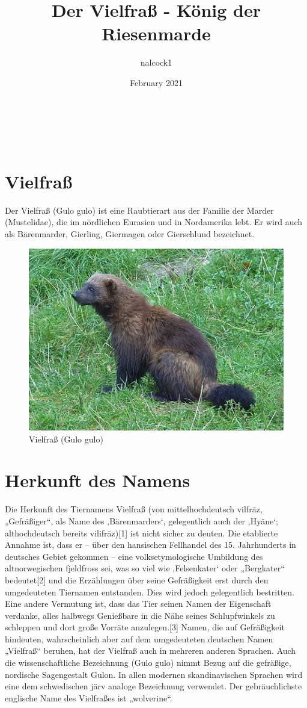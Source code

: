 \documentclass{scrartcl}
\title{Der Vielfraß - König der Riesenmarde}
\author{nalcock1 }
\date{February 2021}
\begin{document}
\maketitle
\tableofcontents
\newpage

\\
\\
\section{Vielfraß}
Der Vielfraß (Gulo gulo) ist eine Raubtierart aus der Familie der Marder (Mustelidae), die im nördlichen Eurasien und in Nordamerika lebt. Er wird auch als Bärenmarder, Gierling, Giermagen oder Gierschlund bezeichnet. 



\begin{figure}[h!]
\centering
\includegraphics[scale=0.7]{Vielfraß}
\caption{Vielfraß (Gulo gulo)}
\label{Vielfraß (Gulo gulo)}
\end{figure}

\section{Herkunft des Namens}
Die Herkunft des Tiernamens Vielfraß (von mittelhochdeutsch vilfrāz, „Gefräßiger“, als Name des ‚Bärenmarders‘, gelegentlich auch der ‚Hyäne‘; althochdeutsch bereits vilifrāz)[1] ist nicht sicher zu deuten. Die etablierte Annahme ist, dass er – über den hansischen Fellhandel des 15. Jahrhunderts in deutsches Gebiet gekommen – eine volksetymologische Umbildung des altnorwegischen fjeldfross sei, was so viel wie ‚Felsenkater‘ oder „Bergkater“ bedeutet[2] und die Erzählungen über seine Gefräßigkeit erst durch den umgedeuteten Tiernamen entstanden. Dies wird jedoch gelegentlich bestritten.
\\
Eine andere Vermutung ist, dass das Tier seinen Namen der Eigenschaft verdanke, alles halbwegs Genießbare in die Nähe seines Schlupfwinkels zu schleppen und dort große Vorräte anzulegen.[3] Namen, die auf Gefräßigkeit hindeuten, wahrscheinlich aber auf dem umgedeuteten deutschen Namen „Vielfraß“ beruhen, hat der Vielfraß auch in mehreren anderen Sprachen. Auch die wissenschaftliche Bezeichnung (Gulo gulo) nimmt Bezug auf die gefräßige, nordische Sagengestalt Gulon. In allen modernen skandinavischen Sprachen wird eine dem schwedischen järv analoge Bezeichnung verwendet. Der gebräuchlichste englische Name des Vielfraßes ist „wolverine“. 
\end{document}
